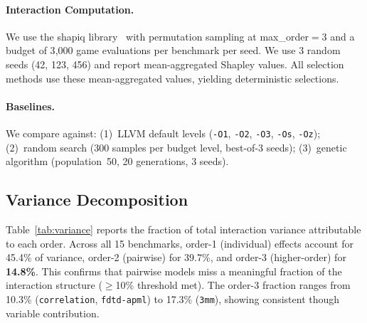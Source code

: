 \documentclass[preprint]{article}
\begin{document}
\paragraph{Interaction Computation.} We use the shapiq library~\citep{muschalik2024shapiq} with permutation sampling at max\_order${=}3$ and a budget of 3{,}000 game evaluations per benchmark per seed. We use 3 random seeds (42, 123, 456) and report mean-aggregated Shapley values. All selection methods use these mean-aggregated values, yielding deterministic selections.

\paragraph{Baselines.} We compare against: (1)~LLVM default levels (\texttt{-O1}, \texttt{-O2}, \texttt{-O3}, \texttt{-Os}, \texttt{-Oz}); (2)~random search (300 samples per budget level, best-of-3 seeds); (3)~genetic algorithm (population~50, 20 generations, 3 seeds).

\subsection{Variance Decomposition}
\label{sec:variance}

Table~\ref{tab:variance} reports the fraction of total interaction variance attributable to each order. Across all 15 benchmarks, order-1 (individual) effects account for 45.4\% of variance, order-2 (pairwise) for 39.7\%, and order-3 (higher-order) for \textbf{14.8\%}. This confirms that pairwise models miss a meaningful fraction of the interaction structure ($\geq$10\% threshold met). The order-3 fraction ranges from 10.3\% (\texttt{correlation}, \texttt{fdtd-apml}) to 17.3\% (\texttt{3mm}), showing consistent though variable contribution.
\end{document}
